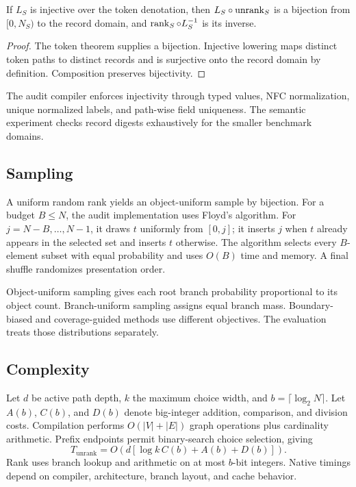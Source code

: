 \begin{theorem}
If \(L_S\) is injective over the token denotation, then \(L_S\circ\operatorname{unrank}_S\) is a bijection from \([0,N_S)\) to the record domain, and \(\operatorname{rank}_S\circ L_S^{-1}\) is its inverse.
\end{theorem}
\begin{proof}
The token theorem supplies a bijection. Injective lowering maps distinct token paths to distinct records and is surjective onto the record domain by definition. Composition preserves bijectivity.
\end{proof}

The audit compiler enforces injectivity through typed values, NFC normalization, unique normalized labels, and path-wise field uniqueness. The semantic experiment checks record digests exhaustively for the smaller benchmark domains.

\subsection{Sampling}
A uniform random rank yields an object-uniform sample by bijection. For a budget \(B\le N\), the audit implementation uses Floyd's algorithm. For \(j=N-B,\ldots,N-1\), it draws \(t\) uniformly from \([0,j]\); it inserts \(j\) when \(t\) already appears in the selected set and inserts \(t\) otherwise. The algorithm selects every \(B\)-element subset with equal probability and uses \(O(B)\) time and memory. A final shuffle randomizes presentation order.

Object-uniform sampling gives each root branch probability proportional to its object count. Branch-uniform sampling assigns equal branch mass. Boundary-biased and coverage-guided methods use different objectives. The evaluation treats those distributions separately.

\subsection{Complexity}
Let \(d\) be active path depth, \(k\) the maximum choice width, and \(b=\lceil\log_2N\rceil\). Let \(A(b)\), \(C(b)\), and \(D(b)\) denote big-integer addition, comparison, and division costs. Compilation performs \(O(|V|+|E|)\) graph operations plus cardinality arithmetic. Prefix endpoints permit binary-search choice selection, giving
\begin{equation}
T_{\mathrm{unrank}}=O\left(d[\log k\,C(b)+A(b)+D(b)]\right).
\end{equation}
Rank uses branch lookup and arithmetic on at most \(b\)-bit integers. Native timings depend on compiler, architecture, branch layout, and cache behavior.

